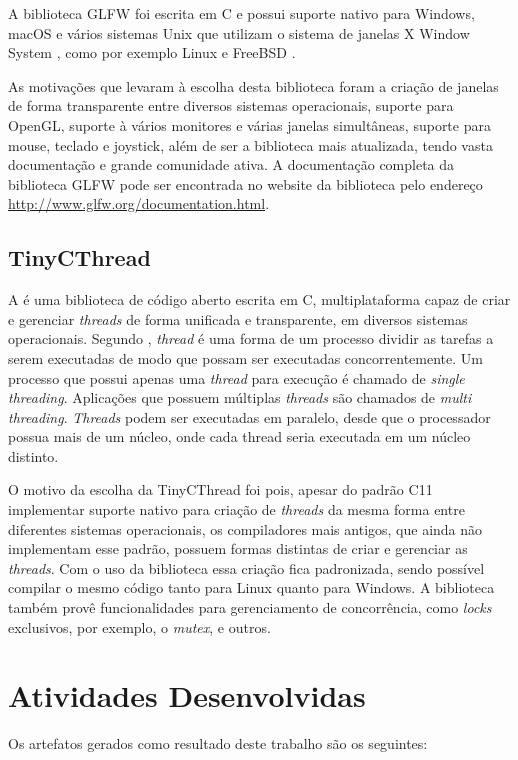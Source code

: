 \documentclass[12pt, %
openright,
oneside, %
a4paper,    %
brazil]{facom-ufu-abntex2}
\begin{document}
A biblioteca GLFW foi escrita em C e possui suporte nativo para Windows, macOS e vários sistemas Unix \cite{Unix:About} que utilizam o sistema de janelas X Window System \cite{X:About}, como por exemplo Linux \cite{Linux:About} e FreeBSD \cite{FreeBSD:About}.

As motivações que levaram à escolha desta biblioteca foram a criação de janelas de forma transparente entre diversos sistemas operacionais, suporte para OpenGL, suporte à vários monitores e várias janelas simultâneas, suporte para mouse, teclado e joystick, além de ser a biblioteca mais atualizada, tendo vasta documentação e grande comunidade ativa. A documentação completa da biblioteca GLFW pode ser encontrada no website da biblioteca pelo endereço \url{http://www.glfw.org/documentation.html}.

\subsection{TinyCThread}
A  é uma biblioteca de código aberto escrita em C, multiplataforma capaz de criar e gerenciar \textit{threads} de forma unificada e transparente, em diversos sistemas operacionais. Segundo , \textit{thread} é uma forma de um processo dividir as tarefas a serem executadas de modo que possam ser executadas concorrentemente. Um processo que possui apenas uma \textit{thread} para execução é chamado de \textit{single threading}. Aplicações que possuem múltiplas \textit{threads} são chamados de \textit{multi threading}. \textit{Threads} podem ser executadas em paralelo, desde que o processador possua mais de um núcleo, onde cada thread seria executada em um núcleo distinto.

O motivo da escolha da TinyCThread foi pois, apesar do padrão C11 implementar suporte nativo para criação de \textit{threads} da mesma forma entre diferentes sistemas operacionais, os compiladores mais antigos, que ainda não implementam esse padrão, possuem formas distintas de criar e gerenciar as \textit{threads}. Com o uso da biblioteca essa criação fica padronizada, sendo possível compilar o mesmo código tanto para Linux quanto para Windows. A biblioteca também provê funcionalidades para gerenciamento de concorrência, como \textit{locks} exclusivos, por exemplo, o \textit{mutex}, e outros.

\section{Atividades Desenvolvidas}
Os artefatos gerados como resultado deste trabalho são os seguintes:
\end{document}
